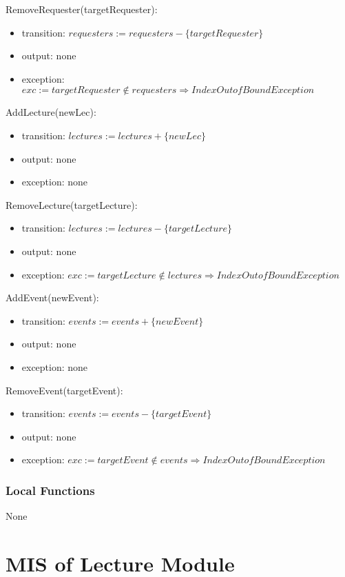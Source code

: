\documentclass[12pt, titlepage]{article}
\begin{document}
\noindent RemoveRequester(targetRequester):
\begin{itemize}
\item transition: $requesters := requesters - \{targetRequester\}$
\item output: none
\item exception: $exc := targetRequester \notin requesters \Rightarrow IndexOutofBound Exception$
\end{itemize}

\noindent AddLecture(newLec):
\begin{itemize}
\item transition: $lectures := lectures + \{newLec\}$
\item output: none
\item exception: none
\end{itemize}

\noindent RemoveLecture(targetLecture):
\begin{itemize}
\item transition: $lectures := lectures - \{targetLecture\}$
\item output: none
\item exception: $exc := targetLecture \notin lectures \Rightarrow IndexOutofBound Exception$
\end{itemize}

\noindent AddEvent(newEvent):
\begin{itemize}
\item transition: $events := events + \{newEvent\}$
\item output: none
\item exception: none
\end{itemize}

\noindent RemoveEvent(targetEvent):
\begin{itemize}
\item transition: $events := events - \{targetEvent\}$
\item output: none
\item exception: $exc := targetEvent \notin events \Rightarrow IndexOutofBound Exception$
\end{itemize}
\subsubsection{Local Functions}

None

\newpage

\section{MIS of Lecture Module} \label{mLec}
\end{document}
